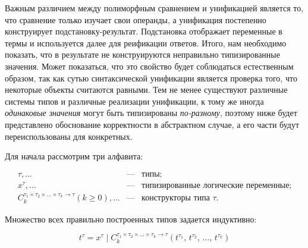 Важным различием между полиморфным сравнением и унификацией является то, что сравнение только изучает свои операнды,
а унификация постепенно конструирует подста\-новку-результат.
Подстановка отображает переменные в термы и используется далее для реификации ответов.
Итого, нам необходимо показать, что в результате не конструируются неправильно типизированные значения.
Может показаться, что это свойство будет соблюдаться естественным образом, так как сутью синтаксической унификации является проверка того, что некоторые объекты считаются равными.
Тем не менее существуют различные системы типов и различные реализации унификации, к тому же иногда \emph{одинаковые значения} могут быть типизированы \emph{по-разному}, поэтому ниже будет представлено обоснование корректности в абстрактном случае, а его части будут переиспользованы для конкретных.


Для начала рассмотрим три алфавита:

\[
\begin{array}{rcl}
  \tau,\dots&\text{---}&\mbox{типы;}\\
  x^\tau,\dots&\text{---}&\mbox{типизированные логические переменные;}\\
  C_k^{\tau_1\times\tau_2\times\dots\times\tau_k\to\tau} (k\geqslant 0),\dots&\text{---}&\mbox{конструкторы типа } \tau.
\end{array}
\]

Множество всех правильно построенных типов задается индуктивно:

\[
t^\tau=x^\tau\mid C_k^{\tau_1\times\tau_2\times\dots\times\tau_k\to\tau}(t^{\tau_1},\,t^{\tau_2},\,\dots,\,t^{\tau_k})
\]

